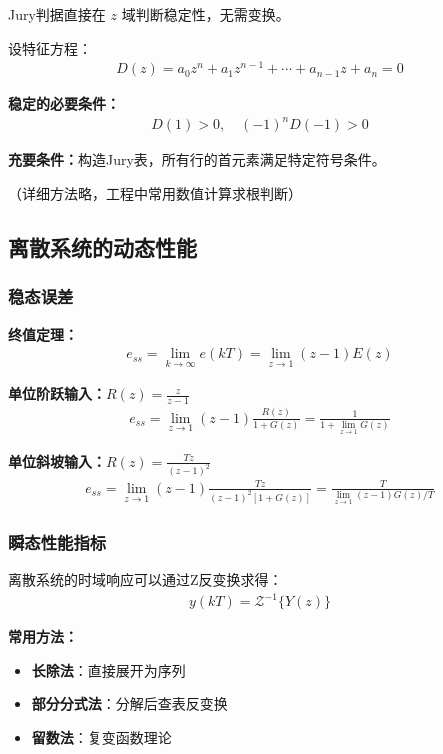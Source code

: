 Jury判据直接在 $z$ 域判断稳定性，无需变换。

设特征方程：
\begin{align*}
D(z) = a_0 z^n + a_1 z^{n-1} + \cdots + a_{n-1} z + a_n = 0
\end{align*}

\textbf{稳定的必要条件：}
\begin{align*}
D(1) > 0, \quad (-1)^n D(-1) > 0
\end{align*}

\textbf{充要条件：}构造Jury表，所有行的首元素满足特定符号条件。

（详细方法略，工程中常用数值计算求根判断）

\subsection{离散系统的动态性能}

\subsubsection{稳态误差}

\textbf{终值定理：}
\begin{align*}
e_{ss} = \lim_{k\to\infty} e(kT) = \lim_{z\to 1} (z-1)E(z)
\end{align*}

\textbf{单位阶跃输入：}$R(z) = \frac{z}{z-1}$
\begin{align*}
e_{ss} = \lim_{z\to 1} (z-1) \frac{R(z)}{1+G(z)} = \frac{1}{1 + \lim_{z\to 1} G(z)}
\end{align*}

\textbf{单位斜坡输入：}$R(z) = \frac{Tz}{(z-1)^2}$
\begin{align*}
e_{ss} = \lim_{z\to 1} (z-1) \frac{Tz}{(z-1)^2[1+G(z)]} = \frac{T}{\lim_{z\to 1} (z-1)G(z)/T}
\end{align*}

\subsubsection{瞬态性能指标}

离散系统的时域响应可以通过Z反变换求得：
\begin{align*}
y(kT) = \mathcal{Z}^{-1}\{Y(z)\}
\end{align*}

\textbf{常用方法：}
\begin{itemize}
    \item \textbf{长除法}：直接展开为序列
    \item \textbf{部分分式法}：分解后查表反变换
    \item \textbf{留数法}：复变函数理论
\end{itemize}

